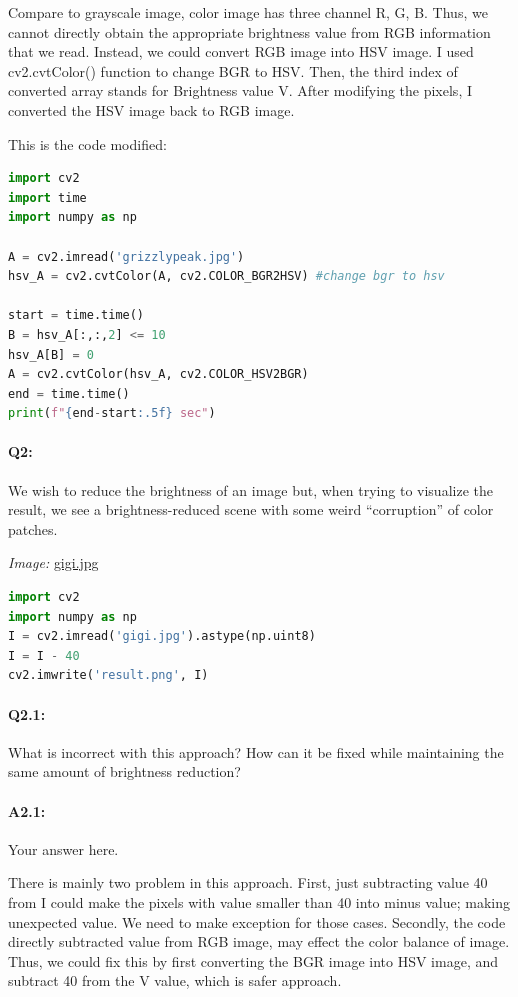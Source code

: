 \documentclass[11pt]{article}
\begin{document}
Compare to grayscale image, color image has three channel R, G, B. Thus, we cannot directly obtain the appropriate brightness value from RGB information that we read.
Instead, we could convert RGB image into HSV image. I used cv2.cvtColor() function to change BGR to HSV.
Then, the third index of converted array stands for Brightness value V. After modifying the pixels, I converted the HSV image back to RGB image.

This is the code modified:

\begin{lstlisting}[language=python]
import cv2
import time
import numpy as np

A = cv2.imread('grizzlypeak.jpg')
hsv_A = cv2.cvtColor(A, cv2.COLOR_BGR2HSV) #change bgr to hsv

start = time.time()
B = hsv_A[:,:,2] <= 10
hsv_A[B] = 0
A = cv2.cvtColor(hsv_A, cv2.COLOR_HSV2BGR)
end = time.time()
print(f"{end-start:.5f} sec")
\end{lstlisting}




\pagebreak
\paragraph{Q2:} We wish to reduce the brightness of an image but, when trying to visualize the result, we see a brightness-reduced scene with some weird ``corruption'' of color patches.

\emph{Image:} \href{gigi.jpg}{gigi.jpg}

\begin{lstlisting}[language=Python]
import cv2
import numpy as np
I = cv2.imread('gigi.jpg').astype(np.uint8)
I = I - 40
cv2.imwrite('result.png', I)
\end{lstlisting}

\paragraph{Q2.1:} What is incorrect with this approach? How can it be fixed while maintaining the same amount of brightness reduction?

\paragraph{A2.1:} Your answer here.

There is mainly two problem in this approach. First, just subtracting value 40 from I could make the pixels with value smaller than 40 into minus value; making unexpected value. We need to make exception for those cases. Secondly, the code directly subtracted value from RGB image, may effect the color balance of image. Thus, we could fix this by first converting the BGR image into HSV image, and subtract 40 from the V value, which is safer approach.
\end{document}
